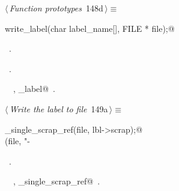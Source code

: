 \documentclass[a4paper]{report}
\begin{document}
\begin{flushleft} \small
\begin{minipage}{\linewidth}\label{scrap326}\raggedright\small
{} $\langle\,${\it Function prototypes}\nobreak\ {\footnotesize {148d}}$\,\rangle\equiv$
\vspace{-1ex}
\begin{list}{}{} \item
\mbox{}\verb@void write_label(char label_name[], FILE * file);@\\
\mbox{}\verb@@{\NWsep}
\end{list}
\vspace{-1.5ex}
\footnotesize
\begin{list}{}{\setlength{\itemsep}{-\parsep}\setlength{\itemindent}{-\leftmargin}}
\item \NWtxtMacroDefBy\ .
\item \NWtxtMacroRefIn\ .
\item \NWtxtIdentsUsed\nobreak\  \verb@FILE@\nobreak\ , \verb@write_label@\nobreak\ .
\item{}
\end{list}
\end{minipage}\vspace{4ex}
\end{flushleft}
\begin{flushleft} \small
\begin{minipage}{\linewidth}\label{scrap327}\raggedright\small
{} $\langle\,${\it Write the label to file}\nobreak\ {\footnotesize {149a}}$\,\rangle\equiv$
\vspace{-1ex}
\begin{list}{}{} \item
\mbox{}\verb@write_single_scrap_ref(file, lbl->scrap);@\\
\mbox{}\verb@fprintf(file, "-%02d", lbl->seq);@{\NWsep}
\end{list}
\vspace{-1.5ex}
\footnotesize
\begin{list}{}{\setlength{\itemsep}{-\parsep}\setlength{\itemindent}{-\leftmargin}}
\item \NWtxtMacroRefIn\ .
\item \NWtxtIdentsUsed\nobreak\  \verb@fprintf@\nobreak\ , \verb@write_single_scrap_ref@\nobreak\ .
\item{}
\end{list}
\end{minipage}\vspace{4ex}
\end{flushleft}
\end{document}
